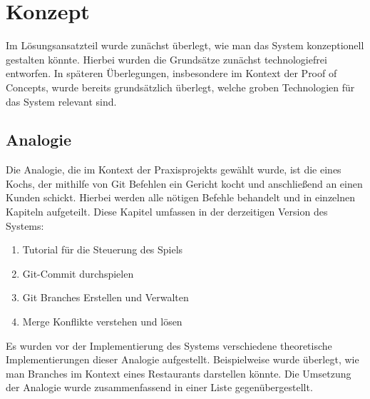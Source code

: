 \section{Konzept}
Im Lösungsansatzteil wurde zunächst überlegt, wie man das System konzeptionell gestalten könnte. Hierbei wurden die Grundsätze zunächst technologiefrei entworfen. In späteren Überlegungen, insbesondere im Kontext der Proof of Concepts, wurde bereits grundsätzlich überlegt, welche groben Technologien für das System relevant sind.

\subsection{Analogie}
Die Analogie, die im Kontext der Praxisprojekts gewählt wurde, ist die eines Kochs, der mithilfe von Git Befehlen ein Gericht kocht und anschließend an einen Kunden schickt. Hierbei werden alle nötigen Befehle behandelt und in einzelnen Kapiteln aufgeteilt.
Diese Kapitel umfassen in der derzeitigen Version des Systems:

\begin{enumerate}
    \item Tutorial für die Steuerung des Spiels
    \item Git-Commit durchspielen
    \item Git Branches Erstellen und Verwalten
    \item Merge Konflikte verstehen und lösen
\end{enumerate}

Es wurden vor der Implementierung des Systems verschiedene theoretische Implementierungen dieser Analogie aufgestellt.
Beispielweise wurde überlegt, wie man Branches im Kontext eines Restaurants darstellen könnte. Die Umsetzung der Analogie wurde zusammenfassend in einer Liste gegenübergestellt.

